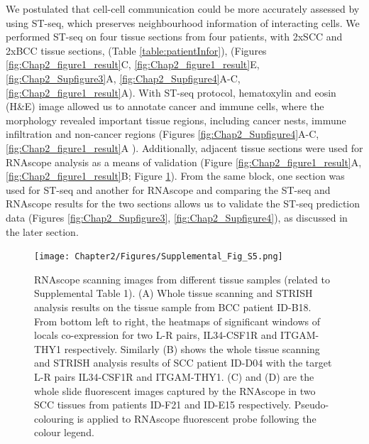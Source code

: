 We postulated that cell-cell communication could be more accurately assessed by using ST-seq, which preserves neighbourhood information of interacting cells. We performed ST-seq on four tissue sections from four patients, with 2xSCC and 2xBCC tissue sections, (Table \ref{table:patientInfor}), (Figures \ref{fig:Chap2_figure1_result}C, \ref{fig:Chap2_figure1_result}E, \ref{fig:Chap2_Supfigure3}A, \ref{fig:Chap2_Supfigure4}A-C, \ref{fig:Chap2_figure1_result}A).  With ST-seq protocol, hematoxylin and eosin (H\&E) image allowed us to annotate cancer and immune cells, where the morphology revealed important tissue regions, including cancer nests, immune infiltration and non-cancer regions (Figures \ref{fig:Chap2_Supfigure4}A-C,\ref{fig:Chap2_figure1_result}A ). Additionally, adjacent tissue sections were used for RNAscope analysis as a means of validation (Figure \ref{fig:Chap2_figure1_result}A, \ref{fig:Chap2_figure1_result}B;  Figure \ref{fig:Chap2_Supfigure5}).  From the same block, one section was used for ST-seq and another for RNAscope and comparing the ST-seq and RNAscope results for the two sections allows us to validate the ST-seq prediction data (Figures \ref{fig:Chap2_Supfigure3}, \ref{fig:Chap2_Supfigure4}), as discussed in the later section. 

\begin{figure}[htp]
\centering
\texttt{[image: Chapter2/Figures/Supplemental\_Fig\_S5.png]}
\caption[RNAscope scanning images from different tissue samples]{RNAscope scanning images from different tissue samples (related to Supplemental Table 1). (A) Whole tissue scanning and STRISH analysis results on the tissue sample from BCC patient ID-B18. From bottom left to right, the heatmaps of significant windows of locals co-expression for two L-R pairs, IL34-CSF1R and ITGAM-THY1 respectively. Similarly (B) shows the whole tissue scanning and STRISH analysis results of SCC patient ID-D04 with the target L-R pairs IL34-CSF1R and ITGAM-THY1. (C) and (D) are the whole slide fluorescent images captured by the RNAscope in two SCC tissues from patients ID-F21 and ID-E15 respectively. Pseudo-colouring is applied to RNAscope fluorescent probe following the colour legend.}
\label{fig:Chap2_Supfigure5}
\end{figure}

